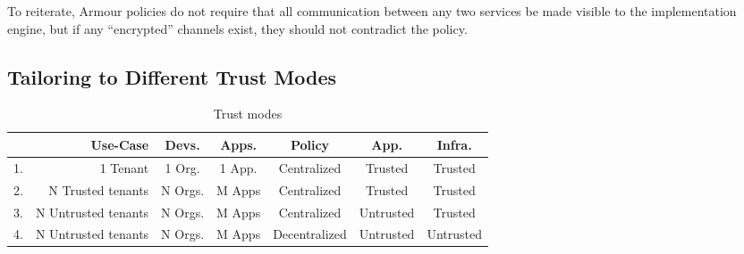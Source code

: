 \documentclass[a4paper%
]{article}
\newcommand{\gp}[1]{\gpnote{#1}}
\newcommand{\armour}{{\sc Armour}}
\begin{document}
To reiterate, \armour{} policies do not require that all communication
between any two services be made visible to the implementation
engine, but if any ``encrypted'' channels exist, they should not
contradict the policy.


\subsection{Tailoring to Different Trust Modes}
\label{sec:attack-surface}

\begin{table}[t]
  \centering
  \small
    \begin{tabular}[t]{| c | r | c | c | c | c | c |}
      \hline
         & Use-Case            & Devs.   & Apps.  & Policy        & App.      & Infra.    \\
      \hline
      1. & 1 Tenant            & 1 Org.  & 1 App. & Centralized   & Trusted   & Trusted   \\
      2. & N Trusted tenants   & N Orgs. & M Apps & Centralized   & Trusted   & Trusted   \\
      3. & N Untrusted tenants & N Orgs. & M Apps & Centralized   & Untrusted & Trusted   \\
      4. & N Untrusted tenants & N Orgs. & M Apps & Decentralized & Untrusted & Untrusted \\
      \hline
    \end{tabular}
    \caption{Trust modes}
    \label{tab:attacker}
  \end{table}



    
\end{document}
